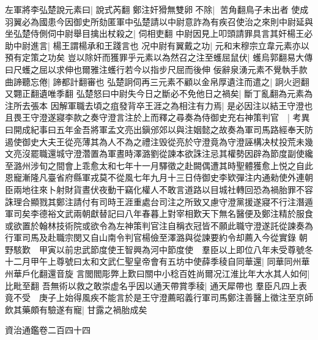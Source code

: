 左軍將李弘楚說元素曰|{
	說式芮翻}
鄭注奸猾無雙卵不除|{
	苦角翻鳥子未出者}
使成羽翼必為國患今因御史所劾匿軍中弘楚請以中尉意詐為有疾召使治之來則中尉延與坐弘楚侍側伺中尉舉目擒出杖殺之|{
	伺相吏翻}
中尉因見上叩頭請罪具言其奸楊王必助中尉進言|{
	楊王謂楊承和王踐言也}
况中尉有翼戴之功|{
	元和末穆宗立韋元素亦以預有定策之功矣}
豈以除奸而獲罪乎元素以為然召之注至蠖屈鼠伏|{
	蠖烏郭翻易大傳曰尺蠖之屈以求伸也爾雅注蠖行若今以指步尺屈而後伸}
佞辭泉湧元素不覺執手款曲諦聽忘倦|{
	諦都計翻審也}
弘楚詗伺再三元素不顧以金帛厚遺注而遣之|{
	詗火迥翻又翾正翻遺唯季翻}
弘楚怒曰中尉失今日之斷必不免他日之禍矣|{
	斷丁亂翻為元素為注所去張本}
因解軍職去頃之疽發背卒王涯之為相注有力焉|{
	是必因注以結王守澄也}
且畏王守澄遂寢李款之奏守澄言注於上而釋之尋奏為侍御史充右神策判官　|{
	考異曰開成紀事曰五年金吾將軍孟文亮出鎭邠郊以與注姻懿之故奏為軍司馬路經奉天防遏使御史大夫王從亮薄其為人不為之禮注毁從亮於守澄竟為守澄誣構决杖投荒未幾文亮沒罷職還城守澄濳置為軍晝時澤潞劉從諫本欲誅注忌其權勢因辟為節度副使纔至潞州涉旬之間會上乖愈太和七年十一月驛徵之赴闕偶遭其時聖體獲愈上悦之自此恩寵漸隆凡臺省府縣軍戎莫不從風七年九月十三日侍御史李欵彈注内通勑使外連朝臣兩地往來卜射財貨晝伏夜動干竊化權人不敢言道路以目城社轉回恐為禍胎罪不容誅理合顯戮其鄭注請付有司時王涯重處台司注之所致又慮守澄黨援遂寢不行注潛遁軍司矣李德裕文武兩朝獻替記曰八年春暮上對宰相歎天下無名醫便及鄭注精於服食或欲置於翰林技術院或欲令為左神策判官注自稱衣冠皆不願此職守澄遂託從諫奏為行軍司馬及赴職宗閔又自山南令判官楊儉至澤潞與從諫要約令却薦入今從實錄}
朝野駭歎　甲寅以前忠武節度使王智興為河中節度使　羣臣以上即位八年未受尊號冬十二月甲午上尊號曰太和文武仁聖皇帝會有五坊中使薛季稜自同華還|{
	同華同州華州華戶化翻還音旋}
言閭閻彫弊上歎曰關中小稔百姓尚爾况江淮比年大水其人如何|{
	比毗至翻}
吾無術以救之敢崇虚名乎因以通天帶賞季稜|{
	通天犀帶也}
羣臣凡四上表竟不受　庚子上始得風疾不能言於是王守澄薦昭義行軍司馬鄭注善醫上徵注至京師飲其藥頗有驗遂有寵|{
	甘露之禍胎成矣}


資治通鑑卷二百四十四
